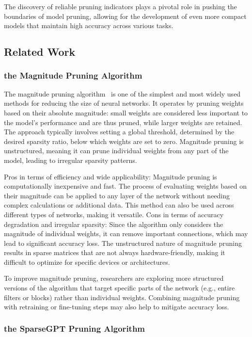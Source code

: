 \documentclass{article} %
\begin{document}
The discovery of reliable pruning indicators plays a pivotal role in pushing the boundaries of model pruning, allowing for the development of even more compact models that maintain high accuracy across various tasks.

\subsection{Related Work}
\subsubsection{the Magnitude Pruning Algorithm}

The magnitude pruning algorithm~\citep{magnitude15} is one of the simplest and most widely used methods for reducing the size of neural networks. It operates by pruning weights based on their absolute magnitude: small weights are considered less important to the model’s performance and are thus pruned, while larger weights are retained. The approach typically involves setting a global threshold, determined by the desired sparsity ratio, below which weights are set to zero. Magnitude pruning is unstructured, meaning it can prune individual weights from any part of the model, leading to irregular sparsity patterns.

Pros in terms of efficiency and wide applicability: Magnitude pruning is computationally inexpensive and fast. The process of evaluating weights based on their magnitude can be applied to any layer of the network without needing complex calculations or additional data. This method can also be used across different types of networks, making it versatile. Cons in terms of accuracy degradation and irregular sparsity: Since the algorithm only considers the magnitude of individual weights, it can remove important connections, which may lead to significant accuracy loss. The unstructured nature of magnitude pruning results in sparse matrices that are not always hardware-friendly, making it difficult to optimize for specific devices or architectures.

To improve magnitude pruning, researchers are exploring more structured versions of the algorithm that target specific parts of the network (e.g., entire filters or blocks) rather than individual weights. Combining magnitude pruning with retraining or fine-tuning steps may also help to mitigate accuracy loss.

\subsubsection{the SparseGPT Pruning Algorithm}
\end{document}
